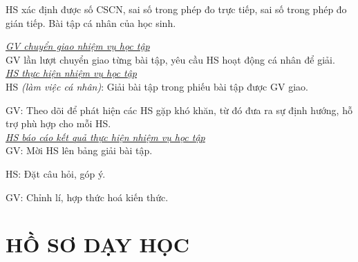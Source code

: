 {
	HS xác định được số CSCN, sai số trong phép đo trực tiếp, sai số trong phép đo gián tiếp.
}
{
	Bài tập cá nhân của học sinh.
}
{
	\textit{\underline{GV chuyển giao nhiệm vụ học tập}}\\
	GV lần lượt chuyển giao từng bài tập, yêu cầu HS hoạt động cá nhân để giải.\\
	\textit{\underline{HS thực hiện nhiệm vụ học tập}}\\
	HS \textit{(làm việc cá nhân)}:  Giải bài tập trong phiếu bài tập được GV giao. 
	
	GV: Theo dõi để phát hiện các HS gặp khó khăn, từ đó đưa ra sự định hướng, hỗ trợ phù hợp cho mỗi HS.\\
	\textit{\underline{HS báo cáo kết quả thực hiện nhiệm vụ học tập}}\\
	GV: Mời HS lên bảng giải bài tập.
	
	HS: Đặt câu hỏi, góp ý.
	
	GV: Chỉnh lí, hợp thức hoá kiến thức.
}

\section{HỒ SƠ DẠY HỌC}
